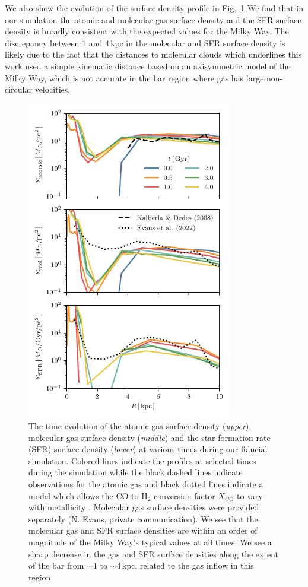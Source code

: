 \documentclass[fleqn,usenatbib]{mnras}
\begin{document}
We also show the evolution of the surface density profile in Fig.~\ref{fig:surf}
We find that in our simulation the atomic and molecular gas surface density and
the SFR surface density is broadly consistent with the expected values for the
Milky Way\cite{2008AA...487..951K,2022ApJ...929L..18E}. The discrepancy between
$1$ and $4\,\textrm{kpc}$ in the molecular and SFR surface density is likely due
to the fact that the distances to molecular clouds which underlines this work
used a simple kinematic distance based on an axisymmetric model of the Milky
Way\cite{2017ApJ...834...57M}, which is not accurate in the bar region where gas
has large non-circular velocities.

\begin{figure}
    \centering
    \includegraphics[width=9cm]{fig/surf_dens.pdf}
    \caption{The time evolution of the atomic gas surface density
    (\textit{upper}), molecular gas surface density (\textit{middle}) and the
    star formation rate (SFR) surface density (\textit{lower}) at various times
    during our fiducial simulation. Colored lines indicate the profiles at
    selected times during the simulation while the black dashed lines indicate
    observations for the atomic gas \citep{2008AA...487..951K} and black dotted
    lines indicate a model which allows the CO-to-H$_2$ conversion factor
    $X_{\textrm{CO}}$ to vary with metallicity \citep{2022ApJ...929L..18E}.
    Molecular gas surface densities were provided separately (N. Evans, private
    communication). We see that the molecular gas and SFR surface densities are
    within an order of magnitude of the Milky Way's typical values at all times.
    We see a sharp decrease in the gas and SFR surface densities along the
    extent of the bar from $\sim1$ to $\sim4\,\textrm{kpc}$, related to the gas
    inflow in this region.}
    \label{fig:surf}
\end{figure}
\end{document}
